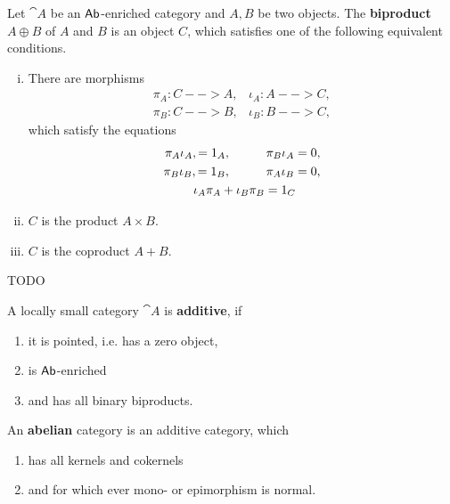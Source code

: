 	\begin{definition}[biproduct]
		Let $\cat{A}$ be an $\textsf{Ab}$-enriched category and $A,B$ be two objects. The \textbf{biproduct} $A \oplus B$ of $A$ and $B$ is an object $C$, which satisfies one of the following equivalent conditions.
		\begin{enumerate}[(i)]
			\item{
				There are morphisms
				$$
					\begin{matrix}
						\pi_A:C-->A,&\iota_A:A-->C,\\
						\pi_B:C-->B,&\iota_B:B-->C,
					\end{matrix}
				$$
				which satisfy the equations
				\begin{align*}
					\pi_A\iota_A, = 1_A, \hspace{1cm}\pi_B\iota_A = 0,\\
					\pi_B\iota_B, = 1_B, \hspace{1cm}\pi_A\iota_B = 0,\\
					\iota_A\pi_A + \iota_B\pi_B = 1_C\hspace{.7cm}
				\end{align*}
			}
			\item{
				$C$ is the product $A \times B$.
			}
			\item{
				$C$ is the coproduct $A + B$.
			}
		\end{enumerate}
	\end{definition}
	\begin{sketch}
		TODO
	\end{sketch}

	\begin{definition}
		A locally small category $\cat{A}$ is \textbf{additive}, if
		\begin{enumerate}[$\circ$]
			\item{it is pointed, i.e. has a zero object,}
			\item{is $\textsf{Ab}$-enriched}
			\item{and has all binary biproducts.}
		\end{enumerate}

		An \textbf{abelian} category is an additive category, which
		\begin{enumerate}[$\circ$]
			\item{has all kernels and cokernels}
			\item{and for which ever mono- or epimorphism is normal.}
		\end{enumerate}
	\end{definition}

